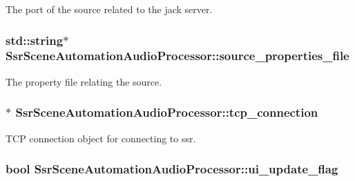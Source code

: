The port of the source related to the jack server. \hypertarget{classSsrSceneAutomationAudioProcessor_a9e35e41e3f46e62c6f34712831d5eda0}{
\subsubsection[{source\-\_\-properties\-\_\-file}]{\setlength{\rightskip}{0pt plus 5cm}std\-::string$\ast$ Ssr\-Scene\-Automation\-Audio\-Processor\-::source\-\_\-properties\-\_\-file\hspace{0.3cm}{\ttfamily [private]}}}\label{classSsrSceneAutomationAudioProcessor_a9e35e41e3f46e62c6f34712831d5eda0}
The property file relating the source. \hypertarget{classSsrSceneAutomationAudioProcessor_a583eadabeda7280aa6c4bfcc3de871d1}{
\subsubsection[{tcp\-\_\-connection}]{$\ast$ Ssr\-Scene\-Automation\-Audio\-Processor\-::tcp\-\_\-connection\hspace{0.3cm}{\ttfamily [private]}}}\label{classSsrSceneAutomationAudioProcessor_a583eadabeda7280aa6c4bfcc3de871d1}
T\-C\-P connection object for connecting to ssr. \hypertarget{classSsrSceneAutomationAudioProcessor_afed1df18714184953906f47aaa174797}{
\subsubsection[{ui\-\_\-update\-\_\-flag}]{\setlength{\rightskip}{0pt plus 5cm}bool Ssr\-Scene\-Automation\-Audio\-Processor\-::ui\-\_\-update\-\_\-flag\hspace{0.3cm}{\ttfamily [private]}}}\label{classSsrSceneAutomationAudioProcessor_afed1df18714184953906f47aaa174797}
